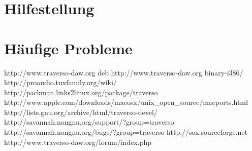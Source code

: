 \documentclass[a4paper,
               12pt,
               pdftex,
               twoside,
               smallheadings,
               headsepline,
               headinclude,
               DIV16,
               BCOR10mm
               ]{scrreprt}
\begin{document}
\chapter{Hilfestellung\label{sect_help}}

\chapter{Häufige Probleme}


\begin{thebibliography}{xx}
   http://www.traverso-daw.org
   deb http://www.traverso-daw.org binary-i386/
   http://proaudio.tuxfamily.org/wiki/
   http://packman.links2linux.org/package/traverso
   http://www.apple.com/downloads/macosx/unix\_open\_source/macports.html
   http://lists.gnu.org/archive/html/traverso-devel/
   http://savannah.nongnu.org/support/?group=traverso
   http://savannah.nongnu.org/bugs/?group=traverso
   http://sox.sourceforge.net
   http://www.traverso-daw.org/forum/index.php
\end{thebibliography}
\end{document}
